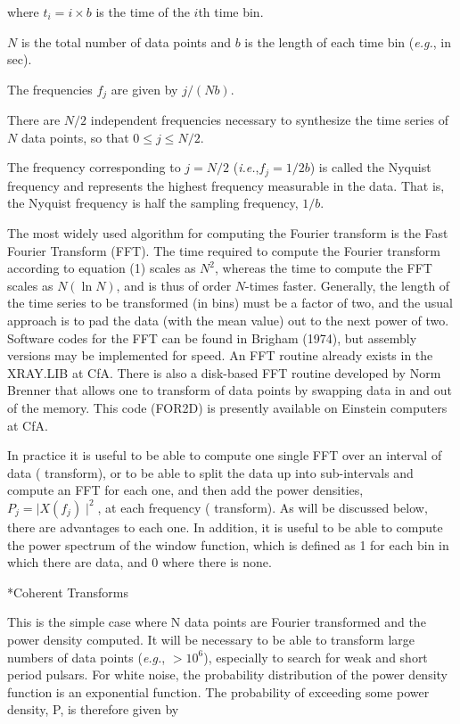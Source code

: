{\list

where $t_i = i \times b$ is the time of the $i$th time
bin.

$N$ is the total number of data points and $b$ is the
length of each time bin ({\it e.g.}, in sec).

The frequencies $f_j$ are given by
$j/(Nb)$.

There are 
$N/2$ independent frequencies necessary to synthesize the time
series of $N$ data points, so that $0 \leq j \leq N/2$.

The frequency corresponding
to $j = N/2$  ({\it i.e.},$f_j = 1/2b$) is called the Nyquist
frequency and represents the
highest frequency measurable in the data.  That is, the Nyquist frequency
is half the sampling frequency, $1/b$.

The most widely used algorithm for
computing the Fourier transform is the Fast Fourier Transform (FFT).  The
time required to compute the Fourier transform according to equation (1)
scales as $N^2$, whereas the time to compute the FFT scales as $N(\ln N)$, and
is thus of order $N$-times faster.  Generally, the length of the time series
to be transformed (in bins) must be a factor of two, and the usual approach
is to pad the data (with the mean value) out to the next power of two.
Software codes for the FFT can be found in Brigham (1974), but assembly
versions may be implemented for speed.  An FFT routine already exists
in the XRAY.LIB at CfA.  There is also a disk-based FFT routine developed
by Norm Brenner that allows one to transform  of data points by
swapping data in and out of the memory.  This code (FOR2D) is presently
available on Einstein computers at CfA.

In practice it is useful to be able to compute one single FFT over an interval
of data ( transform), or to be able to split the data up into
sub-intervals and compute an FFT for each one, and then add the power densities,
$P_j = \mid X(f_j)\mid^2$, at each frequency ( transform).  As will be
discussed below, there are advantages to each one.  In addition, it is useful
to be able to compute the power spectrum of the window function, which is
defined as 1 for each bin in which there are data, and 0 where there is none.

}

\**Coherent Transforms

{\list

This is the simple case where N data points are Fourier transformed and the
power density computed.  It will be necessary to be able to transform large
numbers of data points ({\it e.g.}, $>10^6$), especially to search for weak and
short period pulsars.  For white noise, the probability distribution of the
power density function is an exponential function.  The probability of
exceeding some power density, P, is therefore given by

}

